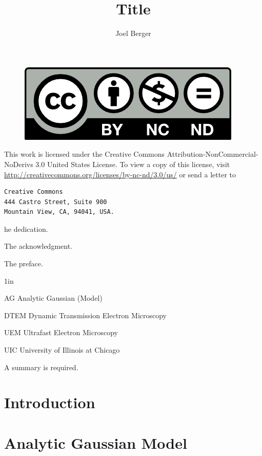 \documentclass{uicthesi}
\title{Title}
\author{Joel Berger}
\begin{document}
\maketitle

\newpage
\begin{figure}
  \centering
  \includegraphics{by-nc-nd}
\end{figure}
This work is licensed under the Creative Commons Attribution-NonCommercial-NoDerivs 3.0 United States License.
To view a copy of this license, visit \url{http://creativecommons.org/licenses/by-nc-nd/3.0/us/} or send a letter to
\begin{verbatim}
Creative Commons
444 Castro Street, Suite 900
Mountain View, CA, 94041, USA.
\end{verbatim}


\dedication
The dedication.
 
\acknowledgment
The acknowledgment.
 
\preface
The preface.
 
\tableofcontents
\listoftables
\listoffigures
 
\listofabbreviations
\begin{list}
{}
{\setlength
   {}{1in}
    \setlength{\leftmargin}{1.5in}
    \setlength{\labelsep}{.5in}
    \setlength{\rightmargin}{\leftmargin}}
\item[AG\hfill] Analytic Gaussian (Model)
\item[DTEM\hfill] Dynamic Transmission Electron Microscopy
\item[UEM\hfill] Ultrafast Electron Microscopy
\item[UIC\hfill] University of Illinois at Chicago
\end{list}
 
\summary
A summary is required.

\chapter{Introduction}

\chapter{Analytic Gaussian Model}
\end{document}
